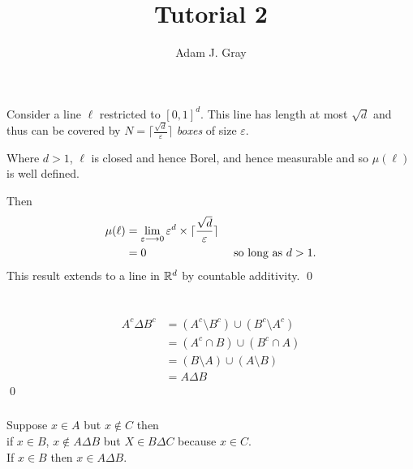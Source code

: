 \documentclass{unswmaths}
\begin{document}
\author{Adam J. Gray}
\title{Tutorial 2}
\subject{Measure Theory}

\unswtitle

\section{}
Consider a line $ \ell $ restricted to $ [0,1]^d $. This line has length at most $ \sqrt{d} $ and thus can be covered by $ N = \lceil \frac{\sqrt{d}}{\varepsilon} \rceil $ \emph{boxes} of size $ \varepsilon $. 

Where $ d > 1 $, $ \ell $ is closed and hence Borel, and hence measurable and so $ \mu(\ell) $ is well defined.

Then 
\begin{align*}
    \mu(\ell) &= \lim_{\varepsilon \longrightarrow 0} \varepsilon^d \times \lceil \frac{\sqrt{d}}{\varepsilon} \rceil \\
        &= 0 & \text{ so long as } d > 1.
\end{align*}
This result extends to a line in $ \mathbb{R}^d $ by countable additivity. \qed
\section{}

\subsection{}

\subsubsection{}

\begin{align*}
    A^c \Delta B^c &= (A^c \setminus B^c) \cup (B^c \setminus A^c) \\
        &= (A^c \cap B) \cup (B^c \cap A) \\
        &= (B \setminus A) \cup (A \setminus B) \\
        &= A \Delta B
\end{align*}
\qed
\subsubsection{}
Suppose $ x \in A $ but $ x \not\in C $ then\\
if $ x \in B $, $ x \not\in A \Delta B $ but $ X \in B \Delta C $ because $ x \in C $. \\
If $ x \in B $ then $ x \in A \Delta B $.
\end{document}
